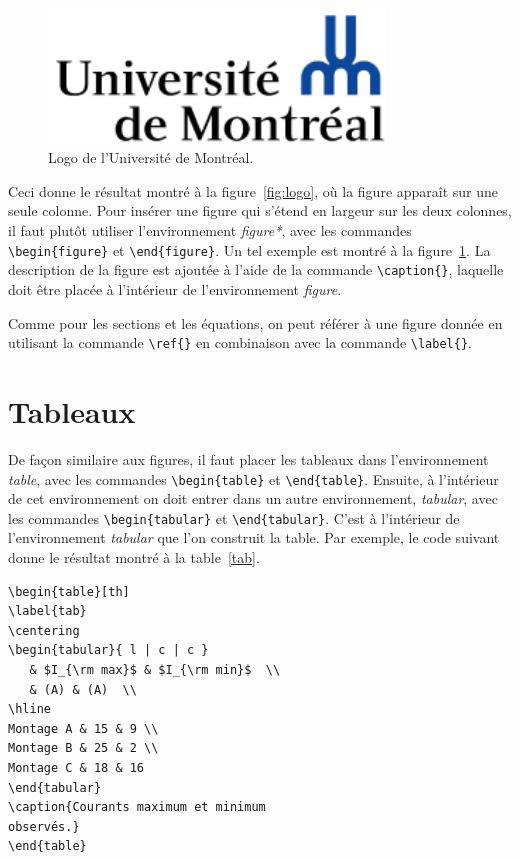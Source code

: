 \documentclass[10pt,letterpaper,twocolumn]{article}
\begin{document}
\begin{figure}[t]
\centering
\includegraphics[width=0.8\textwidth]{logo}
\caption{\label{fig:logo2} Logo de l'Université de Montréal.}
\end{figure}

Ceci donne le résultat montré à la figure~\ref{fig:logo}, où la figure apparaît sur une seule colonne. Pour insérer une figure qui s'étend en largeur sur les deux colonnes, il faut plutôt utiliser l'environnement {\em figure*}, avec les commandes \verb+\begin{figure}+ et \verb+\end{figure}+. Un tel exemple est montré à la figure~\ref{fig:logo2}. La description de la figure est ajoutée à l'aide de la commande \verb+\caption{}+, laquelle doit être placée à l'intérieur de l'environnement {\em figure}.

Comme pour les sections et les équations, on peut référer à une figure donnée en utilisant la commande \verb|\ref{}| en combinaison avec la commande \verb|\label{}|.

\section{Tableaux}

De façon similaire aux figures, il faut placer les tableaux dans l'environnement {\em table}, avec les commandes \verb+\begin{table}+ et \verb+\end{table}+. Ensuite, à l'intérieur de cet environnement on doit entrer dans un autre environnement, {\em tabular}, avec les commandes \verb+\begin{tabular}+ et \verb+\end{tabular}+. C'est à l'intérieur de l'environnement {\em tabular} que l'on construit la table. Par exemple, le code suivant donne le résultat montré à la table~\ref{tab}.
\begin{verbatim}
\begin{table}[th]
\label{tab}
\centering
\begin{tabular}{ l | c | c }
   & $I_{\rm max}$ & $I_{\rm min}$  \\
   & (A) & (A)  \\
\hline
Montage A & 15 & 9 \\
Montage B & 25 & 2 \\
Montage C & 18 & 16
\end{tabular}
\caption{Courants maximum et minimum
observés.}
\end{table}
\end{verbatim}
\end{document}
